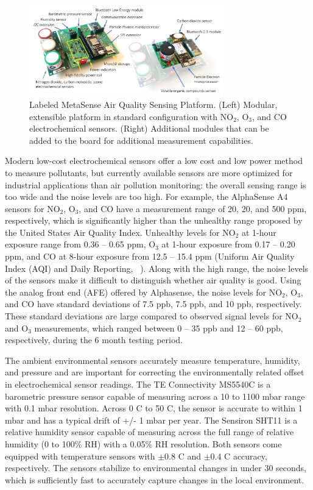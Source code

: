 \documentclass[journal abbreviation, manuscript]{copernicus}
\newcommand{\textus}[1]{$_{\text{#1}}$}
\begin{document}
\begin{figure}
\centering
\includegraphics[width=0.75\textwidth]{writeup/img/metasense-platform}
\caption{Labeled MetaSense Air Quality Sensing Platform. (Left) Modular, extensible platform in standard configuration with NO\textus{2}, O\textus{3}, and CO electrochemical sensors. (Right) Additional modules that can be added to the board for additional measurement capabilities.}
\label{fig:img-label}
\end{figure}

Modern low-cost electrochemical sensors offer a low cost and low power method to measure pollutants, but currently available sensors are more optimized for industrial applications than air pollution monitoring: the overall sensing range is too wide and the noise levels are too high. For example, the AlphaSense A4 sensors for NO\textus{2}, O\textus{3}, and CO have a measurement range of 20, 20, and 500 ppm, respectively, which is significantly higher than the unhealthy range proposed by the United States Air Quality Index. Unhealthy levels for NO\textus{2} at 1-hour exposure range from 0.36 – 0.65 ppm, O\textus{3} at 1-hour exposure from 0.17 – 0.20 ppm, and CO at 8-hour exposure from 12.5 – 15.4 ppm (Uniform Air Quality Index (AQI) and Daily Reporting, ~\citeyear{AQI2015}). Along with the high range, the noise levels of the sensors make it difficult to distinguish whether air quality is good. Using the analog front end (AFE) offered by Alphasense, the noise levels for NO\textus{2}, O\textus{3}, and CO have standard deviations of 7.5 ppb, 7.5 ppb, and 10 ppb, respectively. These standard deviations are large compared to observed signal levels for NO\textus{2} and O\textus{3} measurements, which ranged between 0 – 35 ppb and 12 – 60 ppb, respectively, during the 6 month testing period.

The ambient environmental sensors accurately measure temperature, humidity, and pressure and are important for correcting the environmentally related offset in electrochemical sensor readings. The TE Connectivity MS5540C is a barometric pressure sensor capable of measuring across a 10 to 1100 mbar range with 0.1 mbar resolution. Across 0 C to 50 C, the sensor is accurate to within 1 mbar and has a typical drift of +/- 1 mbar per year. The Sensiron SHT11 is a relative humidity sensor capable of measuring across the full range of relative humidity (0 to 100\% RH) with a 0.05\% RH resolution. Both sensors come equipped with temperature sensors with $\pm$0.8 C and $\pm$0.4 C accuracy, respectively. The sensors stabilize to environmental changes in under 30 seconds, which is sufficiently fast to accurately capture changes in the local environment.
\end{document}
